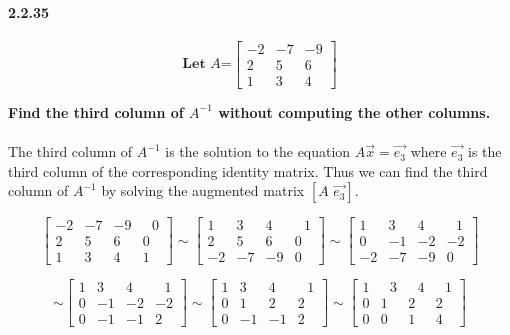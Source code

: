 \documentclass[12pt, oneside]{article}   	%
\begin{document}
\paragraph*{\textbf{2.2.35}}
\[   \textbf{Let $A$=}\left[ \begin{array}{rrr}
-2&-7&-9\\
2&5&6\\
1&3&4\end{array}\right ]\]
\begin{center}
\textbf{Find the third column of $A^{-1}$ without computing the other columns.}
\end{center}

\paragraph{}
The third column of $A^{-1}$ is the solution to the equation $A\vec{x}=\vec{e_3}$ where $\vec{e_3}$ is the third column of the corresponding identity matrix. Thus we can find the third column of $A^{-1}$ by solving the augmented matrix $[A\,\,\vec{e_3}]$.

\[  \left[ \begin{array}{rrrr}
-2&-7&-9&\,\,\,\,0\\
2&5&6&0\\
1&3&4&1\end{array}\right ]\sim
\left[ \begin{array}{rrrr}
1&3&4&\,\,\,\,1\\
2&5&6&0\\
-2&-7&-9&0\end{array}\right ]\sim
\left[ \begin{array}{rrrr}
1&3&4&\,\,\,\,1\\
0&-1&-2&-2\\
-2&-7&-9&0\end{array}\right ]\]

\[\sim\left[ \begin{array}{rrrr}
1&3&4&\,\,\,\,1\\
0&-1&-2&-2\\
0&-1&-1&2\end{array}\right ]\sim
\left[ \begin{array}{rrrr}
1&3&4&\,\,\,\,1\\
0&1&2&2\\
0&-1&-1&2\end{array}\right ]\sim
\left[ \begin{array}{rrrr}
1&\,\,\,\,3&\,\,\,\,4&\,\,\,\,1\\
0&1&2&2\\
0&0&1&4\end{array}\right ]\]
\end{document}
